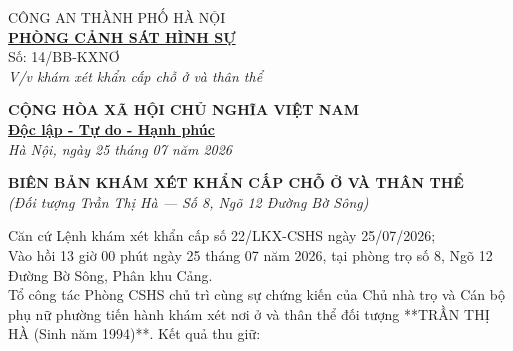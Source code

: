 \documentclass[12pt,a4paper]{article}
\begin{document}
\noindent
\begin{minipage}[t]{0.45\textwidth}
    \begin{center}
        \small
        CÔNG AN THÀNH PHỐ HÀ NỘI\\
        \textbf{\underline{PHÒNG CẢNH SÁT HÌNH SỰ}}\\[0.1cm]
        Số: 14/BB-KXNƠ\\
        \textit{V/v khám xét khẩn cấp chỗ ở và thân thể}
    \end{center}
\end{minipage}
\hfill
\begin{minipage}[t]{0.52\textwidth}
    \begin{center}
        \small
        \textbf{CỘNG HÒA XÃ HỘI CHỦ NGHĨA VIỆT NAM}\\
        \textbf{\underline{Độc lập - Tự do - Hạnh phúc}}\\[0.1cm]
        \textit{Hà Nội, ngày 25 tháng 07 năm 2026}
    \end{center}
\end{minipage}

\vspace{0.6cm}

\begin{center}
    \textbf{\large BIÊN BẢN KHÁM XÉT KHẨN CẤP CHỖ Ở VÀ THÂN THỂ}\\
    \textit{(Đối tượng Trần Thị Hà — Số 8, Ngõ 12 Đường Bờ Sông)}
\end{center}

\vspace{0.3cm}

\noindent Căn cứ Lệnh khám xét khẩn cấp số 22/LKX-CSHS ngày 25/07/2026;\\
Vào hồi 13 giờ 00 phút ngày 25 tháng 07 năm 2026, tại phòng trọ số 8, Ngõ 12 Đường Bờ Sông, Phân khu Cảng.\\
Tổ công tác Phòng CSHS chủ trì cùng sự chứng kiến của Chủ nhà trọ và Cán bộ phụ nữ phường tiến hành khám xét nơi ở và thân thể đối tượng **TRẦN THỊ HÀ (Sinh năm 1994)**. Kết quả thu giữ:
\end{document}
